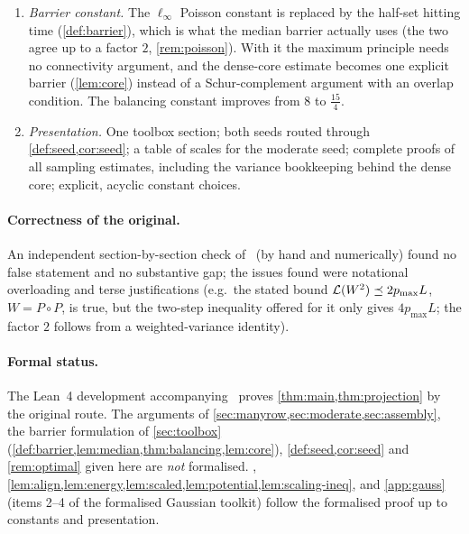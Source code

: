 \begin{enumerate}[label=\arabic*.]
\item \emph{Barrier constant.} The $\ell_\infty$ Poisson constant is replaced by
the half-set hitting time (\cref{def:barrier}), which is what the median barrier
actually uses (the two agree up to a factor $2$, \cref{rem:poisson}). With it the
maximum principle needs no connectivity argument, and the dense-core estimate
becomes one explicit barrier (\cref{lem:core}) instead of a Schur-complement
argument with an overlap condition. The balancing constant improves from $8$ to
$\frac{15}4$.
\item \emph{Presentation.} One toolbox section; both seeds routed through
\cref{def:seed,cor:seed}; a table of scales for the moderate seed; complete
proofs of all sampling estimates, including the variance bookkeeping behind
the dense core; explicit, acyclic constant choices.
\end{enumerate}

\paragraph{Correctness of the original.} An independent section-by-section
check of~\cite{Orig} (by hand and numerically) found no false statement and no
substantive gap; the issues found were notational overloading and terse
justifications (e.g.\ the stated bound $\mathcal L(W^2)\preceq2p_{\max}L$, $W=P\circ P$,
is true, but the two-step inequality offered for it only gives $4p_{\max}L$; the
factor $2$ follows from a weighted-variance identity).

\paragraph{Formal status.} The Lean~4 development accompanying~\cite{Orig}
proves \cref{thm:main,thm:projection} by the original route. The arguments of
\cref{sec:manyrow,sec:moderate,sec:assembly}, the barrier formulation of
\cref{sec:toolbox} (\cref{def:barrier,lem:median,thm:balancing,lem:core}),
\cref{def:seed,cor:seed} and \cref{rem:optimal} given here are \emph{not}
formalised. , \cref{lem:align,lem:energy,lem:scaled,lem:potential,lem:scaling-ineq},
and \cref{app:gauss} (items 2--4 of the formalised Gaussian toolkit) follow the
formalised proof up to constants and presentation.
